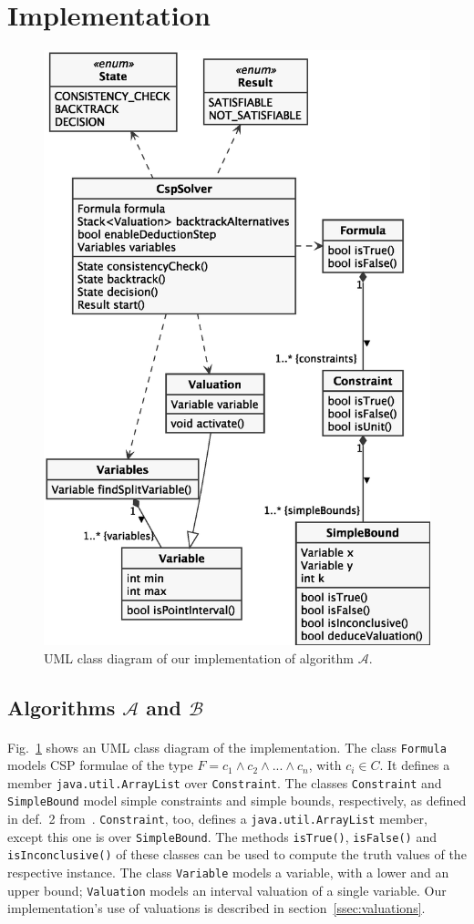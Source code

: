\section{Implementation}

\begin{figure}[H]
    \centering
    \includegraphics[width=.6\textwidth]{images/class-diagram}
    \caption{UML class diagram of our implementation of algorithm $\mathcal{A}$.}
    \label{fig:class-diagram}
\end{figure}


\subsection{Algorithms $\mathcal{A}$ and $\mathcal{B}$}\label{ssec:algorithms}

\paragraph{}
Fig.~\ref{fig:class-diagram} shows an UML class diagram of the implementation.
The class \texttt{Formula} models CSP formulae of the type $F = c_1 \wedge c_2 \wedge ... \wedge c_n$, with $c_i \in C$.
It defines a member \texttt{java.util.ArrayList} over \texttt{Constraint}.
The classes \texttt{Constraint} and \texttt{SimpleBound} model simple constraints and simple bounds, respectively, as defined in def.~2 from~\cite{MF19}.
\texttt{Constraint}, too, defines a \texttt{java.util.ArrayList} member, except this one is over \texttt{SimpleBound}.
The methods \texttt{isTrue()}, \texttt{isFalse()} and\\
\texttt{isInconclusive()} of these classes can be used to compute the truth values of the respective instance.
The class \texttt{Variable} models a variable, with a lower and an upper bound; \texttt{Valuation} models an interval valuation of a single variable.
Our implementation's use of valuations is described in section~\ref{ssec:valuations}.

